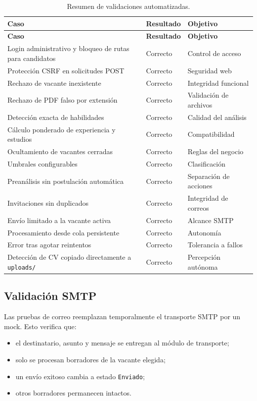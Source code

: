 \documentclass[12pt,a4paper]{article}
\begin{document}
\begin{longtable}{>{\raggedright\arraybackslash}p{8.2cm}>{\centering\arraybackslash}p{2.2cm}>{\raggedright\arraybackslash}p{3.5cm}}
\caption{Resumen de validaciones automatizadas.}\\
\toprule
\textbf{Caso} & \textbf{Resultado} & \textbf{Objetivo} \\
\midrule
\endfirsthead
\toprule
\textbf{Caso} & \textbf{Resultado} & \textbf{Objetivo} \\
\midrule
\endhead
Login administrativo y bloqueo de rutas para candidatos & Correcto & Control de acceso \\
Protección CSRF en solicitudes POST & Correcto & Seguridad web \\
Rechazo de vacante inexistente & Correcto & Integridad funcional \\
Rechazo de PDF falso por extensión & Correcto & Validación de archivos \\
Detección exacta de habilidades & Correcto & Calidad del análisis \\
Cálculo ponderado de experiencia y estudios & Correcto & Compatibilidad \\
Ocultamiento de vacantes cerradas & Correcto & Reglas del negocio \\
Umbrales configurables & Correcto & Clasificación \\
Preanálisis sin postulación automática & Correcto & Separación de acciones \\
Invitaciones sin duplicados & Correcto & Integridad de correos \\
Envío limitado a la vacante activa & Correcto & Alcance SMTP \\
Procesamiento desde cola persistente & Correcto & Autonomía \\
Error tras agotar reintentos & Correcto & Tolerancia a fallos \\
Detección de CV copiado directamente a \texttt{uploads/} & Correcto & Percepción autónoma \\
\bottomrule
\end{longtable}

\subsection{Validación SMTP}

Las pruebas de correo reemplazan temporalmente el transporte SMTP por un mock. Esto verifica que:

\begin{itemize}[leftmargin=*]
    \item el destinatario, asunto y mensaje se entregan al módulo de transporte;
    \item solo se procesan borradores de la vacante elegida;
    \item un envío exitoso cambia a estado \texttt{Enviado};
    \item otros borradores permanecen intactos.
\end{itemize}
\end{document}
